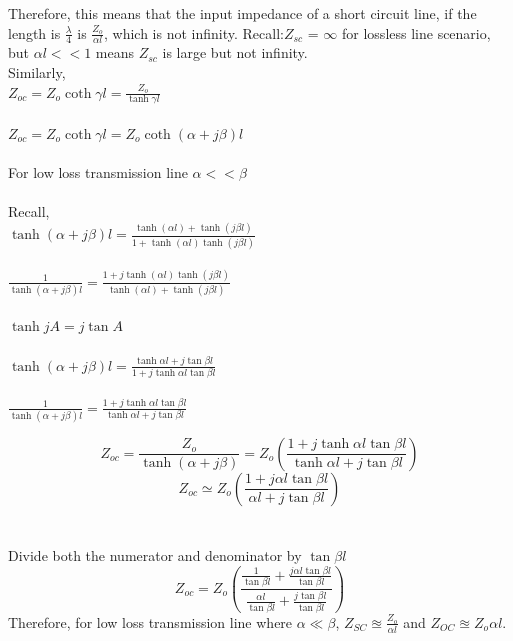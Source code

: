 Therefore, this means that the input impedance of a short circuit line, if the length is $ \frac{\lambda}{4} $ is $ \frac{Z_{o}}{\alpha l} $, which is not infinity. Recall:$ Z_{sc} $ = $ \infty $ for lossless line scenario, but $ \alpha l << 1 $ means $ Z_{sc} $ is large but not infinity.\\

Similarly,\\
$ Z_{oc}=Z_{o}\coth\gamma l=\frac{Z_{o}}{\tanh\gamma l} $\\\\
$ Z_{oc}=Z_{o}\coth\gamma l=Z_{o}\coth(\alpha+j\beta) l $\\\\
For low loss transmission line $ \alpha<<\beta $ \\\\Recall,\\
$ \tanh(\alpha+j\beta)l=\frac{\tanh (\alpha l) + \tanh (j\beta l)}{1 + \tanh (\alpha l)\tanh (j\beta l)} $\\\\
$ \frac{1}{\tanh(\alpha+j\beta)l}=\frac{1 + j\tanh (\alpha l)\tanh (j\beta l)}{\tanh (\alpha l) + \tanh (j\beta l)} $\\\\
$ \tanh jA= j \tan A $\\\\
$ \tanh(\alpha+j\beta)l=\frac{\tanh \alpha l+j\tan \beta l}{1+j\tanh \alpha l\tan \beta l} $\\\\
$ \frac{1}{\tanh(\alpha+j\beta)l}=\frac{1+j\tanh \alpha l\tan \beta l}{\tanh \alpha l+j\tan \beta l} $

\begin{equation}
Z_{oc} = \frac{Z_{o}}{\tanh(\alpha+j\beta)}=Z_{o}\left(\frac{1+j\tanh \alpha l\tan \beta l}{\tanh \alpha l+j\tan \beta l}\right)
\end{equation}
\begin{equation}
Z_{oc} \simeq Z_{o}\left(\frac{1+ j \alpha l\tan \beta l}{\alpha l+j\tan \beta l}\right)
\end{equation}\\\\
Divide both the numerator and denominator by $ \tan \beta l $
\begin{equation}
Z_{oc}=Z_{o}\left(\frac{\frac{1}{\tan \beta l}+\frac{j \alpha l\tan \beta l}{\tan \beta l}}{\frac{\alpha l}{\tan \beta l}+\frac{j\tan \beta l}{\tan \beta l}}\right)
\end{equation}
Therefore, for low loss transmission line where $\alpha\ll\beta$, $ Z_{SC}\approxeq \frac{Z_{o}}{\alpha l} $ and $ Z_{OC} \approxeq Z_{o} \alpha l $. 


